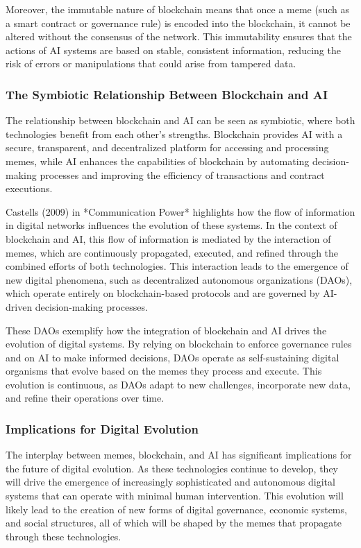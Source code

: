 \documentclass[12pt,twoside]{article}
\begin{document}
Moreover, the immutable nature of blockchain means that once a meme (such as a smart contract or governance rule) is encoded into the blockchain, it cannot be altered without the consensus of the network. This immutability ensures that the actions of AI systems are based on stable, consistent information, reducing the risk of errors or manipulations that could arise from tampered data.

\subsubsection{The Symbiotic Relationship Between Blockchain and AI}

The relationship between blockchain and AI can be seen as symbiotic, where both technologies benefit from each other’s strengths. Blockchain provides AI with a secure, transparent, and decentralized platform for accessing and processing memes, while AI enhances the capabilities of blockchain by automating decision-making processes and improving the efficiency of transactions and contract executions.

Castells (2009) in *Communication Power* highlights how the flow of information in digital networks influences the evolution of these systems. In the context of blockchain and AI, this flow of information is mediated by the interaction of memes, which are continuously propagated, executed, and refined through the combined efforts of both technologies. This interaction leads to the emergence of new digital phenomena, such as decentralized autonomous organizations (DAOs), which operate entirely on blockchain-based protocols and are governed by AI-driven decision-making processes.

These DAOs exemplify how the integration of blockchain and AI drives the evolution of digital systems. By relying on blockchain to enforce governance rules and on AI to make informed decisions, DAOs operate as self-sustaining digital organisms that evolve based on the memes they process and execute. This evolution is continuous, as DAOs adapt to new challenges, incorporate new data, and refine their operations over time.

\subsubsection{Implications for Digital Evolution}

The interplay between memes, blockchain, and AI has significant implications for the future of digital evolution. As these technologies continue to develop, they will drive the emergence of increasingly sophisticated and autonomous digital systems that can operate with minimal human intervention. This evolution will likely lead to the creation of new forms of digital governance, economic systems, and social structures, all of which will be shaped by the memes that propagate through these technologies.
\end{document}

